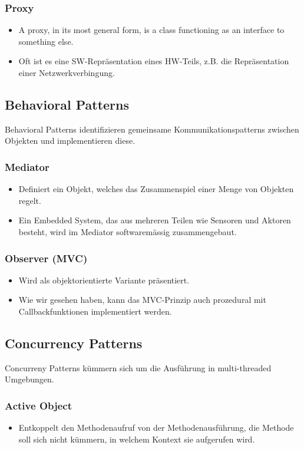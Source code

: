 \subsubsection{Proxy}
  \begin{itemize}
  \item A proxy, in its most general form, is a class functioning as an interface to something else.
  \item Oft ist es eine SW-Repräsentation eines HW-Teils, z.B. die Repräsentation einer
  Netzwerkverbingung.
  \end{itemize}

\subsection{Behavioral Patterns}
Behavioral Patterns identifizieren gemeinsame Kommunikationspatterns zwischen Objekten und implementieren diese.
\subsubsection{Mediator}
  \begin{itemize}
  \item Definiert ein Objekt, welches das Zusammenspiel einer Menge von Objekten regelt.
  \item Ein Embedded System, das aus mehreren Teilen wie Sensoren und Aktoren besteht, wird im Mediator softwaremässig zusammengebaut.
  \end{itemize}
\subsubsection{Observer (MVC)}
  \begin{itemize}
  \item Wird als objektorientierte Variante präsentiert.
  \item Wie wir gesehen haben, kann das MVC-Prinzip auch prozedural mit Callbackfunktionen implementiert werden.
  \end{itemize}
  
\subsection{Concurrency Patterns}
Concurreny Patterns kümmern sich um die Ausführung in multi-threaded Umgebungen.
\subsubsection{Active Object}
  \begin{itemize}
  \item Entkoppelt den Methodenaufruf von der Methodenausführung, die Methode soll sich nicht kümmern, in welchem Kontext sie aufgerufen wird.
  \end{itemize}
